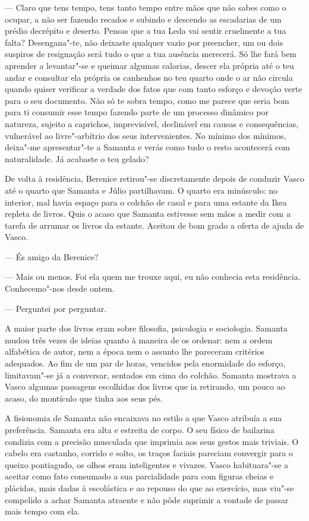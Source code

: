 --- Claro que tens tempo, tens tanto tempo entre mãos que não sabes como o
  ocupar, a não ser fazendo recados e subindo e descendo as escadarias
  de um prédio decrépito e deserto. Pensas que a tua Leda vai sentir
  cruelmente a tua falta? Desengana"-te, não deixaste qualquer vazio por
  preencher, um ou dois suspiros de resignação será tudo o que a tua
  ausência merecerá. Só lhe fará bem aprender a levantar"-se e queimar
  algumas calorias, descer ela própria até o teu andar e consultar
  ela própria os canhenhos no teu quarto onde o ar não circula quando
  quiser verificar a verdade dos fatos que com tanto esforço e devoção
  verte para o seu documento. Não só te sobra tempo, como me parece que
  seria bom para ti consumir esse tempo fazendo parte de um processo
  dinâmico por natureza, sujeito a caprichos, imprevisível, declinável
  em causas e consequências, vulnerável ao livre"-arbítrio dos seus
  intervenientes. No mínimo dos mínimos, deixa"-me apresentar"-te a
  Samanta e verás como tudo o resto acontecerá com naturalidade. Já
  acabaste o teu gelado?

De volta à residência, Berenice retirou"-se discretamente depois de
conduzir Vasco até o quarto que Samanta e Júlio partilhavam. O quarto
era minúsculo: no interior, mal havia
espaço para o colchão de casal e para uma estante da Ikea repleta de
livros. Quis o acaso que Samanta estivesse sem mãos a medir com a tarefa
de arrumar os livros da estante. Aceitou de bom grado a oferta de ajuda
de Vasco.

--- És amigo da Berenice?

--- Mais ou menos. Foi ela quem me trouxe aqui, eu não conhecia esta
  residência. Conhecemo"-nos desde ontem.

--- Perguntei por perguntar.

A maior parte dos livros eram sobre filosofia, psicologia e sociologia.
Samanta mudou três vezes de ideias quanto à maneira de os ordenar: nem
a ordem alfabética de autor, nem a época nem o assunto lhe pareceram
critérios adequados. Ao fim de um par de horas, vencidos pela enormidade
do esforço, limitavam"-se já a conversar, sentados em cima do colchão.
Samanta mostrava a Vasco algumas passagens escolhidas dos livros que ia
retirando, um pouco ao acaso, do montículo que tinha aos seus pés.

A fisionomia de Samanta não encaixava no estilo a que Vasco atribuía a
sua preferência. Samanta era alta e estreita de corpo. O seu físico de
bailarina condizia com a precisão musculada que imprimia aos seus
gestos mais triviais. O cabelo era castanho, corrido e solto, os traços
faciais pareciam convergir para o queixo pontiagudo, os olhos eram
inteligentes e vivazes. Vasco habituara"-se a aceitar como fato
consumado a sua parcialidade para com figuras cheias e plácidas, mais
dadas à escolástica e ao repouso do que ao exercício, mas viu"-se compelido a achar Samanta atraente e não pôde suprimir a vontade de
passar mais tempo com ela.

